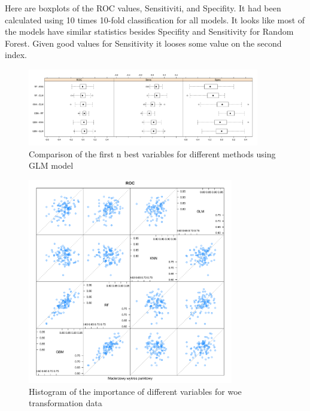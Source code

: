 \documentclass[10pt]{article}\usepackage[]{graphicx}\usepackage[]{color}
\begin{document}
Here are boxplots of the ROC values, Sensitiviti, and Specifity. It had been calculated using 10 times 10-fold classification for all models. It looks like most of the models have similar statistics besides Specifity and Sensitivity for Random Forest. Given good values for Sensitivity it looses some value on the second index.


\begin{figure}[h!]
  \centering
  \includegraphics[width=0.9\textwidth]{Plots/STATS_DIF_MODEL_COMPARE}
  \caption[Close up of \textit{Hemidactylus} sp.]
   {Comparison of the first n best variables for different methods using GLM model}
\end{figure}



\begin{figure}[h!]
  \centering
  \includegraphics[width=0.8\textwidth]{Plots/SCATTER_MODEL_COMPARE}
  \caption[Close up of \textit{Hemidactylus} sp.]
   {Histogram of the importance of different variables for woe transformation data}
\end{figure}
\end{document}
